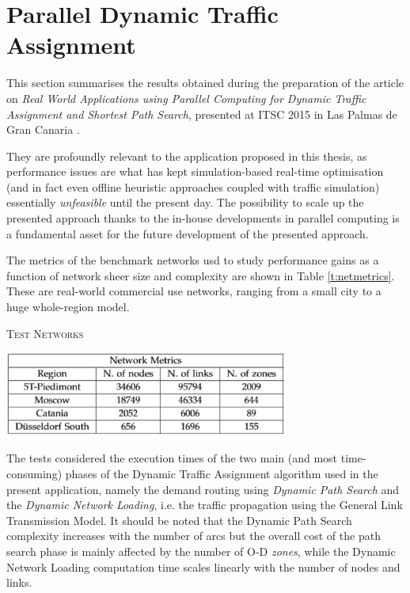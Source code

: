 \chapter{Parallel Dynamic Traffic Assignment} \label{a:parallel}
This section summarises the results obtained during the preparation of the article on \emph{Real World Applications using Parallel Computing for Dynamic Traffic Assignment and Shortest Path Search}, presented at ITSC 2015 in Las Palmas de Gran Canaria \citep{attanasi2015real}.

They are profoundly relevant to the application proposed in this thesis, as performance issues are what has kept simulation-based real-time optimisation (and in fact even offline heuristic approaches coupled with traffic simulation) essentially \emph{unfeasible} until the present day. The possibility to scale up the presented approach thanks to the in-house developments in parallel computing is a fundamental asset for the future development of the presented approach.

The metrics of the benchmark networks usd to study performance gains as a function of network sheer size and complexity are shown in Table \ref{t:netmetrics}. These are real-world commercial use networks, ranging from a small city to a huge whole-region model.

\begin{table}[h]
\caption{\textsc{Test Networks}} \label{t:netmetrics}
\begin{center}
\includegraphics[width=0.7\textwidth]{PIX/netmetrics.jpg}
\end{center}
\end{table}

The tests considered the execution times of the two main (and most time-consuming) phases of the Dynamic Traffic Assignment algorithm used in the present application, namely the demand routing using \emph{Dynamic Path Search} and the \emph{Dynamic Network Loading}, i.e. the traffic propagation using the General Link Transmission Model. It should be noted that the Dynamic Path Search complexity increases with the number of arcs but the overall cost of the path search phase is mainly affected by the number of O-D \emph{zones}, while the Dynamic Network Loading computation time scales linearly with the number of nodes and links.

